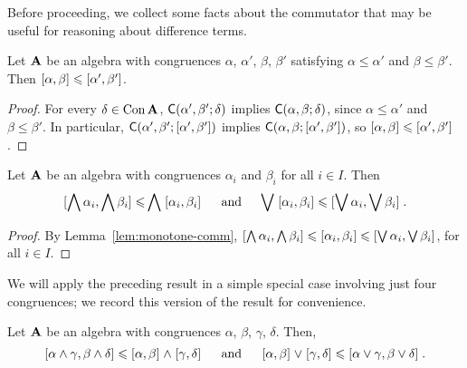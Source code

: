 \draftsecskip

Before proceeding, we collect some facts about the commutator that may be
useful for reasoning about difference terms.


\begin{lem}
  \label{lem:monotone-comm}
  Let $\mathbf{A}$ be an algebra
  with congruences
  $\alpha$, $\alpha'$, $\beta$, $\beta'$ satisfying
  $\alpha\leq \alpha'$ and $\beta \leq \beta'$.
  Then $\mathrel{[\alpha, \beta]} {\leqslant} \mathrel{[\alpha', \beta']}$.
\end{lem}
\begin{proof}
  For every $\delta \in \operatorname{Con}\mathbf{A}$, $\mathsf{C}(\alpha', \beta'; \delta)$ implies
  $\mathsf{C}(\alpha, \beta; \delta)$, since $\alpha\leq \alpha'$ and $\beta \leq \beta'$.
  In particular, $\mathsf{C}(\alpha', \beta'; [\alpha', \beta'])$ implies
  $\mathsf{C}(\alpha, \beta; [\alpha', \beta'])$, so
  $\mathrel{[\alpha, \beta]} {\leqslant} \mathrel{[\alpha', \beta']}$.
\end{proof}



\begin{lem}
  \label{lem:complete-meet-join-monotone}
Let $\mathbf{A}$ be an algebra with congruences
$\alpha_i$ and 
$\beta_i$ %
for all $i \in I$.
Then
\[
\mathrel{[\bigwedge \alpha_i, \bigwedge \beta_i]} {\leqslant}
\bigwedge \mathrel{[\alpha_i, \beta_i]}
\quad \text{ and } \quad
\bigvee \mathrel{[\alpha_i, \beta_i]} {\leqslant}
\mathrel{[\bigvee \alpha_i, \bigvee \beta_i]}.
\]
\end{lem}

\begin{proof}
  By Lemma~\ref{lem:monotone-comm}, $\mathrel{[\bigwedge \alpha_i, \bigwedge \beta_i]} {\leqslant}
  \mathrel{[\alpha_i, \beta_i]} {\leqslant} \mathrel{[\bigvee \alpha_i, \bigvee \beta_i]}$,
  for all $i \in I$.
\end{proof}

We will apply the preceding result in a simple special case involving
just four congruences; we record this version of the result for convenience.
\begin{cor}
  \label{cor:facts-about-comm-1}
Let $\mathbf{A}$ be an algebra with congruences
$\alpha$, $\beta$, $\gamma$, $\delta$.  Then,
\[
\mathrel{[\alpha \wedge \gamma, \beta \wedge \delta]} {\leqslant}
\mathrel{[\alpha, \beta]} \wedge \mathrel{[\gamma, \delta]}
\quad \text{ and } \quad
\mathrel{[\alpha, \beta]} \vee \mathrel{[\gamma, \delta]} {\leqslant}
\mathrel{[\alpha \vee \gamma, \beta \vee \delta]}.
\]
\end{cor}



